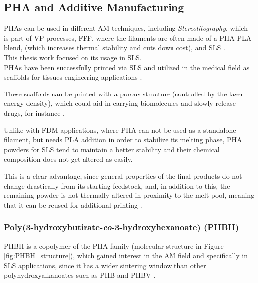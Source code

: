 \documentclass[a4paper]{article}
\begin{document}
    \clearpage

    
    \subsection{PHA and Additive Manufacturing \label{PHA_in_Additive}}

    PHAs can be used in different AM techniques, including \textit{Stereolitography}, which is part of VP processes, 
    FFF, where the filaments are often made of a PHA-PLA blend, (which increases thermal stability and cuts down cost), 
    and SLS \autocite{Kovalcik_PHA_Review}. \\ 

    This thesis work focused on its usage in SLS. \\ 

    PHAs have been successfully printed via SLS and utilized in the medical field as scaffolds for tissues engineering applications \autocites{Messori_Bondioli_PHAs}. 

    These scaffolds can be printed with a porous structure (controlled by the laser energy density), 
    which could aid in carrying biomolecules and slowly release drugs, for instance \autocites{Messori_Bondioli_PHAs,PHBV_SLS_scaffolds}.
    
    Unlike with FDM applications, where PHA can not be used as a standalone filament, but needs PLA addition in order to stabilize its melting 
    phase, PHA powders for SLS tend to maintain a better stability and their chemical composition does not get altered as easily. 

    This is a clear advantage, since general properties of the final products do not change drastically from its starting feedstock, 
    and, in addition to this, the remaining powder is not thermally altered in proximity to the melt pool, meaning that it can 
    be reused for additional printing \autocite{Kovalcik_PHA_Review}.  \\
        
    \subsubsection{Poly(3-hydroxybutirate-\textit{co}-3-hydroxyhexanoate) (PHBH) \label{PHBH}}

    PHBH is a copolymer of the PHA family (molecular structure in Figure \ref{fig:PHBH_structure}), which gained 
    interest in the AM field and specifically in SLS applications, since it has a wider sintering window than other polyhydroxyalkanoates
    such as PHB and PHBV \autocites{DechetMaximilianA2020OtDo,doi:10.1063/1.4918516}. \\ 
\end{document}
